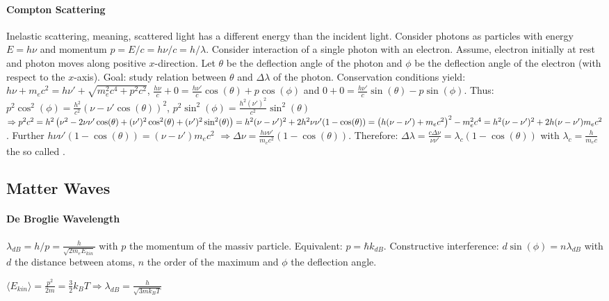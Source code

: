 \paragraph{Compton Scattering}
Inelastic scattering, meaning, scattered light has a different energy
than the incident light. Consider photons as particles with energy $E = h \nu$
and momentum $p = E / c = h \nu / c = h / \lambda$. Consider interaction of a
single photon with an electron. Assume, electron initially at rest and photon moves
along positive $x$-direction. Let $\theta$ be the deflection angle of the photon
and $\phi$ be the deflection angle of the electron (with respect to the $x$-axis).
Goal: study relation between $\theta$ and $\Delta \lambda$ of the photon.
Conservation conditions yield:
$h \nu + m_e c^2 = h \nu' + \sqrt{m_e^2 c^4 + p^2 c^2}$,
$\frac{h \nu}{c} + 0 = \frac{h \nu'}{c} \cos(\theta) + p \cos(\phi)$
and $0 + 0 = \frac{h \nu'}{c} \sin(\theta) - p \sin(\phi)$. Thus:
$p^2 \cos^2 (\phi) = \frac{h^2}{c^2} (\nu - \nu' \cos(\theta))^2$,
$p^2 \sin^2 (\phi) = \frac{h^2 (\nu')^2}{c^2} \sin^2(\theta)$
$\Rightarrow p^2 c^2 = h^2 \left( \nu^2 - 2 \nu \nu' \cos(\theta) + (\nu')^2
\cos^2(\theta) + (\nu')^2 \sin^2(\theta) \right) = h^2 (\nu-\nu')^2 + 2 h^2 \nu \nu' (1-\cos(\theta))
= \left( h(\nu - \nu') + m_e c^2 \right)^2 - m_e^2 c^4
= h^2 (\nu - \nu')^2 + 2 h (\nu - \nu') m_e c^2$. Further
$h \nu \nu' (1-\cos(\theta)) = (\nu - \nu') m_e c^2$
$\Rightarrow \Delta \nu = \frac{h \nu \nu'}{m_e c^2} (1-\cos(\theta))$.
Therefore:
$\Delta \lambda = \frac{c \Delta \nu}{\nu \nu'}
= \lambda_c (1-\cos(\theta))$ with $\lambda_c = \frac{h}{m_e c}$
the so called .


\subsection{Matter Waves}

\paragraph{De Broglie Wavelength}
$\lambda_{dB} = h / p = \frac{h}{\sqrt{2 m_e E_{kin}}}$ with $p$ the momentum of
the massiv particle. Equivalent: $p = \hbar k_{dB}$. Constructive interference: $d \sin(\phi) = n \lambda_{dB}$
with $d$ the distance between atoms, $n$ the order of the maximum and $\phi$ the
deflection angle.

$\langle E_{kin} \rangle = \frac{p^2}{2m} = \frac{3}{2} k_B T
\Rightarrow \lambda_{dB} = \frac{h}{\sqrt{3 m k_B T}}$

